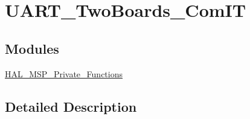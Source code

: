 \hypertarget{group__UART__TwoBoards__ComIT}{\section{U\-A\-R\-T\-\_\-\-Two\-Boards\-\_\-\-Com\-I\-T}
\label{group__UART__TwoBoards__ComIT}
}
\subsection*{Modules}
\begin{DoxyCompactItemize}
\item 
\hyperlink{group__HAL__MSP__Private__Functions}{H\-A\-L\-\_\-\-M\-S\-P\-\_\-\-Private\-\_\-\-Functions}
\end{DoxyCompactItemize}


\subsection{Detailed Description}
